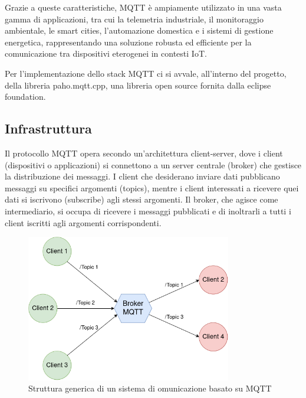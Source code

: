 \noindent Grazie a queste caratteristiche, MQTT è ampiamente utilizzato in una vasta gamma di applicazioni, tra cui la telemetria industriale, il monitoraggio ambientale, le smart cities, l'automazione domestica e i sistemi di gestione energetica, rappresentando una soluzione robusta ed efficiente per la comunicazione tra dispositivi eterogenei in contesti IoT.

\noindent Per l'implementazione dello stack MQTT ci si avvale, all'interno del progetto, della libreria paho.mqtt.cpp\cite{paho_cpp}, una libreria open source fornita dalla eclipse foundation.

\subsection{Infrastruttura}
\noindent Il protocollo MQTT opera secondo un'architettura client-server, dove i client (dispositivi o applicazioni) si connettono a un server centrale (broker) che gestisce la distribuzione dei messaggi. I client che desiderano inviare dati pubblicano messaggi su specifici argomenti (topics), mentre i client interessati a ricevere quei dati si iscrivono (subscribe) agli stessi argomenti. Il broker, che agisce come intermediario, si occupa di ricevere i messaggi pubblicati e di inoltrarli a tutti i client iscritti agli argomenti corrispondenti.

\begin{figure}[H]
  \centering
  \includegraphics[width=0.8\textwidth]{figures/mqtt_structure.png}
  \caption{Struttura generica di un sistema di omunicazione basato su MQTT}
  \label{mqtt_structure}
\end{figure}

